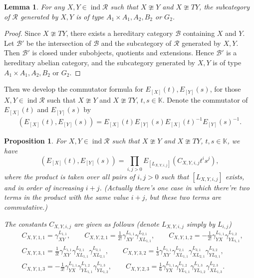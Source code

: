 \documentclass[12pt]{amsart}
\newtheorem{lemma}[theorem]{Lemma}
\newtheorem{proposition}[theorem]{Proposition}
\begin{document}
\begin{lemma}\label{ABG}
    For any $X,Y\in \operatorname{ind}\mathcal{R}$ such that $X\ncong Y$ and $X\ncong TY$, the subcategory of $\mathcal{R}$ generated by $X,Y$ is of type $A_1\times A_1,A_2,B_2$ or $G_2$.
\end{lemma}

\begin{proof}
    Since $X\ncong TY$, there exists a hereditary category $\mathcal{B}$ containing $X$ and $Y$.
    Let $\mathcal{B}'$ be the intersection of $\mathcal{B}$ and the subcategory of $\mathcal{R}$ generated by $X,Y$.
    Then $\mathcal{B}'$ is closed under subobjects, quotients and extensions.
    Hence $\mathcal{B}'$ is a hereditary abelian category, and the subcategory generated by $X,Y$ is of type $A_1\times A_1,A_2,B_2$ or $G_2$.
\end{proof}



Then we develop the commutator formula for $E_{[X]}(t),E_{[Y]}(s)$, for those $X,Y\in \operatorname{ind}\mathcal{R}$ such that $X\ncong Y$ and $X \ncong TY$, $ t,s \in \mathbb{K}$. 
Denote the commutator of $E_{[X]}(t)$ and $E_{[Y]}(s)$ by
\begin{align*}
    (E_{[X]}(t),E_{[Y]}(s)) = E_{[X]}(t) E_{[Y]}(s) E_{[X]}(t)^{-1} E_{[Y]}(s)^{-1} .
\end{align*}


\begin{proposition}\label{commutator}
    For $X,Y\in \operatorname{ind}\mathcal{R}$ such that $X\ncong Y$ and $X \ncong TY$, $ t,s\in \mathbb{K}$, we have
    \begin{equation*}
        (E_{[X]}(t),E_{[Y]}(s))= \prod\limits_{i,j>0} E_{[L_{X,Y,i,j}]}(C_{X,Y,i,j}t^i s^j),
    \end{equation*}
where the product is taken over all pairs of $i,j>0$ such that $[L_{X,Y,i,j}]$ exists, and in order of increasing $i+j$. 
(Actually there's one case in which there're two terms in the product with the same value $i+j$, but these two terms are commutative.)

The constants $C_{X,Y,i,j}$ are given as follows (denote $L_{X,Y,i,j}$ simply by $L_{i,j}$)
\begin{align*}
    &C_{X,Y,1,1} = \gamma_{XY}^{L_{1,1}}, \qquad C_{X,Y,2,1} = \frac{1}{2!}\gamma_{XY}^{L_{1,1}}\gamma_{XL_{1,1}}^{L_{2,1}}, \qquad C_{X,Y,1,2} = -\frac{1}{2!}\gamma_{YX}^{L_{1,1}}\gamma_{YL_{1,1}}^{L_{1,2}}, \\
    &C_{X,Y,3,1} = \frac{1}{3!}\gamma_{XY}^{L_{1,1}}\gamma_{XL_{1,1}}^{L_{2,1}}\gamma_{XL_{2,1}}^{L_{3,1}},\qquad C_{X,Y,3,2} = \frac{1}{3} \gamma_{XY}^{L_{1,1}} \gamma_{XL_{1,1}}^{L_{2,1}} \gamma_{XL_{2,1}}^{L_{3,1}} \gamma_{YL_{3,1}}^{L_{3,2}},\\
    &C_{X,Y,1,3} = - \frac{1}{3!}\gamma_{YX}^{L_{1,1}}\gamma_{YL_{1,1}}^{L_{1,2}}\gamma_{YL_{1,2}}^{L_{1,3}} ,\qquad C_{X,Y,2,3} = \frac{1}{6} \gamma_{YX}^{L_{1,1}} \gamma_{YL_{1,1}}^{L_{1,2}} \gamma_{YL_{1,2}}^{L_{1,3}} \gamma_{XL_{1,3}}^{L_{2,3}}  . 
\end{align*}

\end{proposition}
\end{document}
